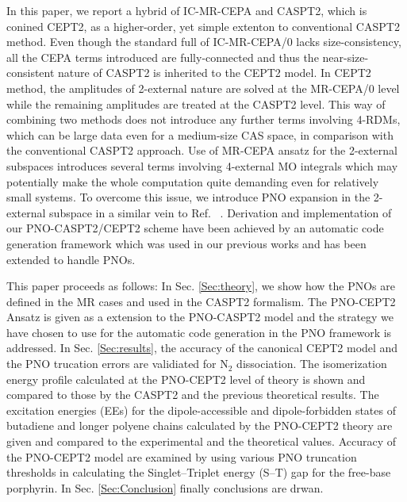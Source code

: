 \documentclass[aip,jcp,amsmath]{revtex4-1}
\begin{document}
%
%

In this paper, we report a hybrid of IC-MR-CEPA and CASPT2, which is conined CEPT2, as a higher-order, yet simple extenton to conventional CASPT2 method.
%
Even though the standard full of IC-MR-CEPA/0 lacks size-consistency, all the CEPA terms introduced are fully-connected and thus the near-size-consistent nature of CASPT2 is inherited to the CEPT2 model.
%
In CEPT2 method, the amplitudes of 2-external nature are solved at the MR-CEPA/0 level while the remaining amplitudes are treated at the CASPT2 level.
%
This way of combining two methods does not introduce any further terms involving 4-RDMs, which can be large data even for a medium-size CAS space, in comparison with the conventional CASPT2 approach.
%
Use of MR-CEPA ansatz for the 2-external subspaces introduces several terms involving 4-external MO integrals which may potentially make the whole computation quite demanding even for relatively small systems.
%
To overcome this issue, we introduce PNO expansion in the 2-external subspace in a similar vein to Ref. ~.
%
Derivation and implementation of our PNO-CASPT2/CEPT2 scheme have been achieved by an automatic code generation framework which was used in our previous works\cite{saitowmultireference2013,doi:10.1021/acs.jctc.5b00270} and has been extended to handle PNOs.

%
This paper proceeds as follows:
%
In Sec. \ref{Sec:theory}, we show how the PNOs are defined in the MR cases and used in the CASPT2 formalism.
%
The PNO-CEPT2 Ansatz is given as a extension to the PNO-CASPT2 model and the strategy we have chosen to use for the automatic code generation in the PNO framework is addressed.
%
In Sec. \ref{Sec:results}, the accuracy of the canonical CEPT2 model and the PNO trucation errors are validiated for N${}_2$ dissociation.
%
The isomerization energy profile calculated at the PNO-CEPT2 level of theory is shown and compared to those by the CASPT2 and the previous theoretical results.
%
The excitation energies (EEs) for the dipole-accessible and dipole-forbidden states of butadiene and longer polyene chains calculated by the PNO-CEPT2 theory are given and compared to the experimental and the theoretical values.
%
Accuracy of the PNO-CEPT2 model are examined by using various PNO truncation thresholds in calculating the Singlet--Triplet energy (S--T) gap for the free-base porphyrin.
%
In Sec. \ref{Sec:Conclusion} finally conclusions are drwan.
\end{document}
